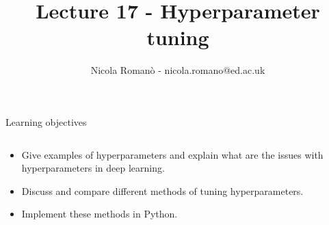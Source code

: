 \documentclass[9pt, aspectratio=169]{beamer}
\author{Nicola Roman\`o - nicola.romano@ed.ac.uk}
\title{Lecture 17 - Hyperparameter tuning}
\date{}
\begin{document}

\begin{frame}
    \titlepage
\end{frame}

\begin{frame}
    {Learning objectives}
    \begin{columns}
        \begin{column}{0.8\textwidth}
            \begin{itemize}
                \item Give examples of hyperparameters and explain what are the issues with hyperparameters in deep learning.
                \item Discuss and compare different methods of tuning hyperparameters.
                \item Implement these methods in Python.
            \end{itemize}
        \end{column}
        \begin{column}{0.2\textwidth}

\end{column}
\end{columns}
\end{frame}
\end{document}
